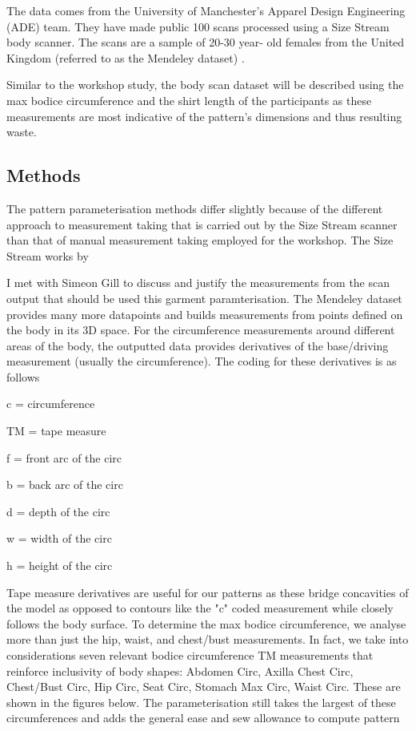 The data comes from the University of Manchester's Apparel Design Engineering (ADE) team. They have made public 100 scans processed using a Size Stream body scanner. The scans are a sample of 20-30 year- old females from the United Kingdom (referred to as the Mendeley dataset) \cite{parker_100_2017}.

Similar to the workshop study, the body scan dataset will be described using the max bodice circumference and the shirt length of the participants as these measurements are most indicative of the pattern's dimensions and thus resulting waste.

\subsection{Methods}
The pattern parameterisation methods differ slightly because of the different approach to measurement taking that is carried out by the Size Stream scanner than that of manual measurement taking employed for the workshop. The Size Stream works by

I met with Simeon Gill to discuss and justify the measurements from the scan output that should be used this garment paramterisation. The Mendeley dataset provides many more datapoints and builds measurements from points defined on the body in its 3D space. For the circumference measurements around different areas of the body, the outputted data provides derivatives of the base/driving measurement (usually the circumference). The coding for these derivatives is as follows

c = circumference

TM = tape measure

f = front arc of the circ

b = back arc of the circ

d = depth of the circ

w = width of the circ

h = height of the circ


Tape measure derivatives are useful for our patterns as these bridge concavities of the model as opposed to contours like the "c" coded measurement while closely follows the body surface. To determine the max bodice circumference, we analyse more than just the hip, waist, and chest/bust measurements. In fact, we take into considerations seven relevant bodice circumference TM measurements that reinforce inclusivity of body shapes: Abdomen Circ, Axilla Chest Circ, Chest/Bust Circ, Hip Circ, Seat Circ, Stomach Max Circ, Waist Circ. These are shown in the figures below. The parameterisation still takes the largest of these circumferences and adds the general ease and sew allowance to compute pattern 

